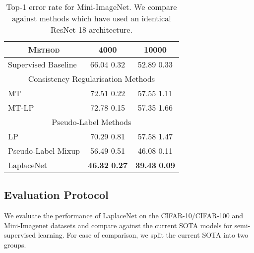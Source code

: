 \documentclass[journal]{IEEEtran}
\begin{document}
\begin{table}[h]
\centering
\caption{Top-1 error rate for Mini-ImageNet. We compare against methods which have used an identical ResNet-18 architecture.}
\vspace{3pt}
\begin{tabular}{|l|cc|}
\hline
\multicolumn{1}{|c}{\cellcolor{gray!25} \textsc{Method}} & \cellcolor{gray!25} 4000 & \multicolumn{1}{c|}{\cellcolor{gray!25} 10000} \\ \hline
Supervised Baseline & 66.04  0.32 & 52.89  0.33\\ \hline

\multicolumn{3}{|c|}{\cellcolor{gray!25} Consistency Regularisation Methods}  \\ \hline
MT & 72.51  0.22 & 57.55  1.11\\
MT-LP & 72.78  0.15 & 57.35  1.66 \\ \hline
\multicolumn{3}{|c|}{\cellcolor{gray!25} Pseudo-Label Methods}  \\ \hline
LP & 70.29  0.81 & 57.58  1.47 \\ 
Pseudo-Label Mixup & 56.49  0.51 & 46.08  0.11 \\ 
LaplaceNet  & \textbf{46.32}  \textbf{0.27} & \textbf{39.43}  \textbf{0.09} \\ \hline
\end{tabular}
\label{mini-image:table}
\end{table}

\subsection{Evaluation Protocol}
We evaluate the performance of LaplaceNet on the CIFAR-10/CIFAR-100 and Mini-Imagenet datasets and compare against the current SOTA models for semi-supervised learning. For ease of comparison, we split the current SOTA into two groups.
\end{document}
